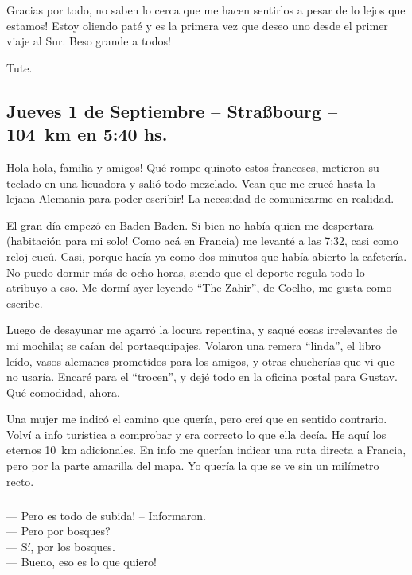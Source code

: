 \textexclamdown Gracias por todo, no saben lo cerca que me hacen sentirlos a
pesar de lo lejos que estamos! Estoy oliendo pat\'e y es la primera vez que
deseo uno desde el primer viaje al Sur. \textexclamdown Beso grande a todos!

Tute.

\subsection*{Jueves 1 de Septiembre -- Stra\ss bourg -- 104~km en 5:40 hs.}

\textexclamdown Hola hola, familia y amigos! Qu\'e rompe quinoto estos
franceses, metieron su teclado en una licuadora y sali\'o todo mezclado.
\textexclamdown Vean que me cruc\'e hasta la lejana Alemania para poder
escribir! La necesidad de comunicarme en realidad.

El gran d\'ia empez\'o en Baden-Baden. Si bien no hab\'ia quien me despertara
(\textexclamdown habitaci\'on para mi solo! Como ac\'a en Francia) me
levant\'e a las 7:32, casi como reloj cuc\'u. Casi, porque hac\'ia ya como dos
minutos que hab\'ia abierto la cafeter\'ia. No puedo dormir m\'as de ocho
horas, siendo que el deporte regula todo lo atribuyo a eso. Me dorm\'i ayer
leyendo ``The Zahir'', de Coelho, me gusta como escribe.

Luego de desayunar me agarr\'o la locura repentina, y saqu\'e cosas
irrelevantes de mi mochila; se ca\'ian del portaequipajes. Volaron una remera
``linda'', el libro le\'ido, vasos alemanes prometidos para los amigos, y otras
chucher\'ias que vi que no usar\'ia. Encar\'e para el ``trocen'', y dej\'e todo
en la oficina postal para Gustav. Qu\'e comodidad, ahora.

Una mujer me indic\'o el camino que quer\'ia, pero cre\'i que en sentido
contrario. Volv\'i a info tur\'istica a comprobar y era correcto lo que ella
dec\'ia. He aqu\'i los eternos 10~km adicionales. En info me quer\'ian indicar
una ruta directa a Francia, pero por la parte amarilla del mapa. Yo quer\'ia
la que se ve sin un mil\'imetro recto.

\subparagraph{}\label{ssub:Subida} --- \textexclamdown Pero es todo de subida!
-- Informaron.\\ --- \textquestiondown Pero por bosques?\\ --- S\'i, por los
bosques.\\ --- Bueno, \textexclamdown eso es lo que quiero!\\ \hangindent=1cm

